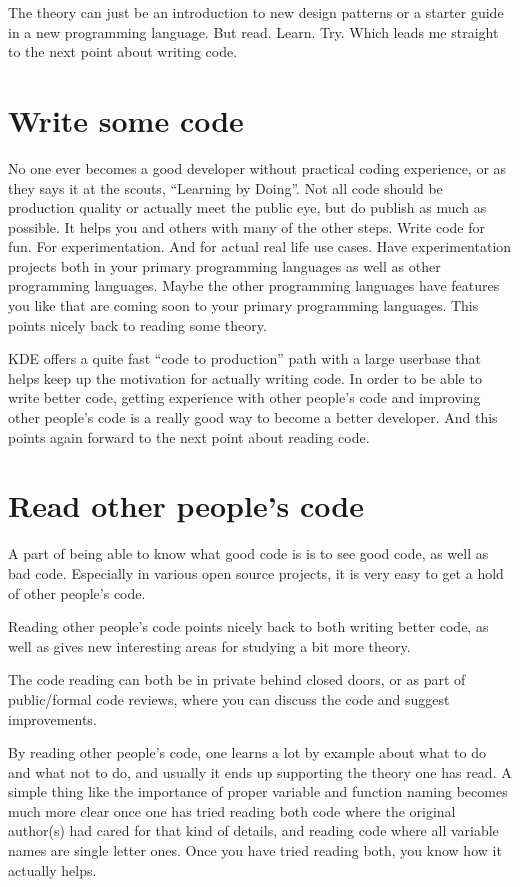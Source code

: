The theory can just be an introduction to new design patterns or a starter guide in a new programming language. But read. Learn. Try. Which leads me straight to the next point about writing code.

\section*{Write some code}
No one ever becomes a good developer without practical coding experience, or as they says it at the scouts, “Learning by Doing”. Not all code should be production quality or actually meet the public eye, but do publish as much as possible. It helps you and others with many of the other steps. Write code for fun. For experimentation. And for actual real life use cases. Have experimentation projects both in your primary programming languages as well as other programming languages. Maybe the other programming languages have features you like that are coming soon to your primary programming languages. This points nicely back to reading some theory.

KDE offers a quite fast “code to production” path with a large userbase that helps keep up the motivation for actually writing code.
In order to be able to write better code, getting experience with other people's code and improving other people's code is a really good way to become a better developer. And this points again forward to the next point about reading code.

\section*{Read other people's code}
A part of being able to know what good code is is to see good code, as well as bad code. Especially in various open source projects, it is very easy to get a hold of other people's code.

Reading other people's code points nicely back to both writing better code, as well as gives new interesting areas for studying a bit more theory.

The code reading can both be in private behind closed doors, or as part of public/formal code reviews, where you can discuss the code and suggest improvements.

By reading other people's code, one learns a lot by example about what to do and what not to do, and usually it ends up supporting the theory one has read. A simple thing like the importance of proper variable and function naming becomes much more clear once one has tried reading both code where the original author(s) had cared for that kind of details, and reading code where all variable names are single letter ones. Once you have tried reading both, you know how it actually helps.

